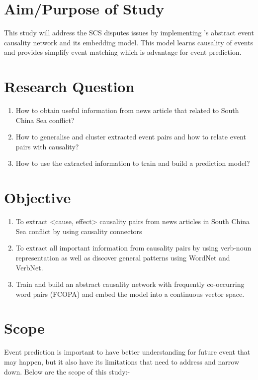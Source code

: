 \documentclass[twoside]{utmthesis}
\begin{document}
\section{Aim/Purpose of Study}
This study will address the SCS disputes issues by implementing \cite{zhao2017constructing}'s abstract event causality network and its embedding model. This model learns causality of events and provides simplify event matching which is advantage for event prediction. 

\section{Research Question} 
\begin{enumerate}
	\item How to obtain useful information from news article that related to South China Sea conflict?
	\item How to generalise and cluster extracted event pairs and how to relate event pairs with causality?
	\item How to use the extracted information to train and build a prediction model?
\end{enumerate}

\section{Objective}
\begin{enumerate}
	
	\item To extract <cause, effect> causality pairs from news articles in South China Sea conflict by using causality connectors
	
	\item To extract all important information from causality pairs by using verb-noun representation as well as discover general patterns using WordNet and VerbNet.  
	
	\item Train and build an abstract causality network with frequently co-occurring word pairs (FCOPA) and embed the model into a continuous vector space.
\end{enumerate}

\section{Scope} 
Event prediction is important to have better understanding for future event that may happen, but it also have its limitations that need to address and narrow down. Below are the scope of this study:-
\end{document}
